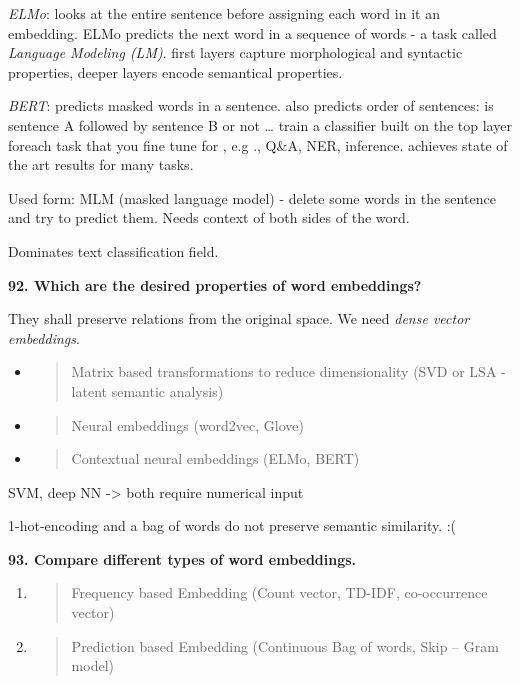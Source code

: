 \textit{ELMo}: looks at the entire sentence before assigning each
word in it an embedding. ELMo predicts the next word in a sequence of
words - a task called \emph{Language Modeling (LM)}. first layers
capture morphological and syntactic properties, deeper layers encode
semantical properties.

\textit{BERT}: predicts masked words in a sentence. also predicts
order of sentences: is sentence A followed by sentence B or not \ldots{}
train a classifier built on the top layer foreach task that you fine
tune for , e.g ., Q\&A, NER, inference. achieves state of the art
results for many tasks.

Used form: MLM (masked language model) - delete some words in the
sentence and try to predict them. Needs context of both sides of the
word.

Dominates text classification field.

\textbf{92. Which are the desired properties of word embeddings?}

They shall preserve relations from the original space. We need
\emph{dense vector embeddings}.

\begin{itemize}
\item
  \begin{quote}
  Matrix based transformations to reduce dimensionality (SVD or LSA -
  latent semantic analysis)
  \end{quote}
\item
  \begin{quote}
  Neural embeddings (word2vec, Glove)
  \end{quote}
\item
  \begin{quote}
  Contextual neural embeddings (ELMo, BERT)
  \end{quote}
\end{itemize}

SVM, deep NN -\textgreater{} both require numerical input

1-hot-encoding and a bag of words do not preserve semantic similarity.
:(

\textbf{93. Compare different types of word embeddings.}

\begin{enumerate}
\def\labelenumi{\arabic{enumi}.}
\item
  \begin{quote}
  Frequency based Embedding (Count vector, TD-IDF, co-occurrence vector)
  \end{quote}
\item
  \begin{quote}
  Prediction based Embedding (Continuous Bag of words, Skip -- Gram
  model)
  \end{quote}
\end{enumerate}

